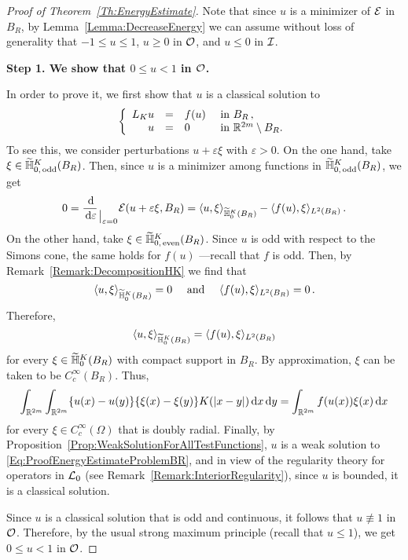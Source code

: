 \begin{proof}[Proof of Theorem~\ref{Th:EnergyEstimate}]

Note that since $u$ is a minimizer of $\mathcal{E}$ in $B_R$, by Lemma~\ref{Lemma:DecreaseEnergy} we can assume without loss of generality that $-1 \leq u \leq 1$, $u \geq 0$ in $\mathcal{O}$, and $u \leq 0$ in $\mathcal{I}$. 

\textbf{Step 1. We show that $0\leq u < 1$ in $\mathcal{O}$.} 

In order to prove it, we first show that $u$ is a classical solution to
\begin{equation}
\label{Eq:ProofEnergyEstimateProblemBR}
	\left\{\begin{array}{rcll}
	L_K  u &=& f(u) & \textrm{ in } B_R\,,\\
	u &=& 0 & \textrm{ in }\mathbb{R}^{2m} \setminus B_R.
	\end{array} \right.
\end{equation}
To see this, we consider perturbations $u +  \varepsilon \xi$ with $\varepsilon>0$. On the one hand, take $\xi \in \widetilde{\mathbb{H}}^K_{0, \,\mathrm{odd}}(B_R)$. Then, since $u$ is a minimizer among functions in $\widetilde{\mathbb{H}}^K_{0, \,\mathrm{odd}}(B_R)$, we get
$$
0 = \dfrac{\,\mathrm{d}}{\,\mathrm{d} \varepsilon}_{\mkern1.5mu\big\vert_{\scriptstyle \varepsilon = 0}} \mathcal{E}(u +  \varepsilon \xi, B_R) = \langle u,\xi \rangle_{\widetilde{\mathbb{H}}^K_0(B_R)} - \langle f(u),\xi \rangle_{L^2(B_R)}\,.
$$
On the other hand, take $\xi \in \widetilde{\mathbb{H}}^K_{0, \,\mathrm{even}}(B_R)$. Since $u$ is odd with respect to the Simons cone, the same holds for $f(u)$ ---recall that $f$ is odd. Then, by Remark~\ref{Remark:DecompositionHK} we find that
$$
\langle u,\xi \rangle_{\widetilde{\mathbb{H}}^K_0(B_R)} = 0 \quad \textrm{ and } \quad  \langle f(u),\xi \rangle_{L^2(B_R)} = 0\,.
$$
Therefore, 
$$
\langle u,\xi \rangle_{\widetilde{\mathbb{H}}^K_0(B_R)} = \langle f(u),\xi \rangle_{L^2(B_R)}
$$
for every $\xi \in\widetilde{\mathbb{H}}^K_0(B_R)$ with compact support in  $B_R$. By approximation, $\xi$ can be taken to be $C^\infty_c(B_R)$. Thus,
$$
\int_{\mathbb{R}^{2m}}\int_{\mathbb{R}^{2m}} \{u(x)-u(y)\}\{\xi(x)-\xi(y)\} K(|x-y|) \,\mathrm{d} x \,\mathrm{d} y = \int_{\mathbb{R}^{2m}} f(u(x)) \xi(x) \,\mathrm{d} x
$$
for every $\xi \in C^\infty_c(\Omega)$ that is doubly radial. Finally, by Proposition~\ref{Prop:WeakSolutionForAllTestFunctions}, $u$ is a weak solution to \eqref{Eq:ProofEnergyEstimateProblemBR}, and in view of the regularity theory for operators in $\mathcal{L}_0$ (see Remark~\ref{Remark:InteriorRegularity}), since $u$ is bounded, it is a classical solution.

Since $u$ is a classical solution that is odd and continuous, it follows that $u \not \equiv 1$ in $\mathcal{O}$. Therefore, by the usual strong maximum principle (recall that $u\leq 1$), we get $0\leq u < 1$ in $\mathcal{O}$. 


\end{proof}
